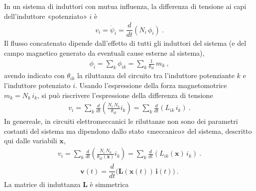 \documentclass[letterpaper,10pt,italian]{jupyterBook}
\begin{document}
\sphinxAtStartPar
In un sistema di induttori con mutua influenza, la differenza di tensione ai capi dell’induttore «potenziato» \(i\) è
\begin{equation*}
\begin{split}v_i = \dot{\psi}_i = \dfrac{d}{dt} \left( N_i \, \phi_i \right) \ .\end{split}
\end{equation*}
\sphinxAtStartPar
Il flusso concatenato dipende dall’effetto di tutti gli induttori del sistema (e del campo magnetico generato da eventuali cause esterne al sistema),
\begin{equation*}
\begin{split}\phi_i = \sum_{k} \phi_{ik} = \sum_{k} \frac{1}{\theta_{ik}} \, m_k \ ,\end{split}
\end{equation*}
\sphinxAtStartPar
avendo indicato con \(\theta_{ik}\) la riluttanza del circuito tra l’induttore potenziante \(k\) e l’induttore potenziato \(i\). Usando l’espressione della forza magneto\sphinxhyphen{}motrice \(m_k = N_k \, i_k\), si può riscrivere l’espressione della differenza di tensione
\begin{equation*}
\begin{split}v_i = \sum_k \frac{d}{dt} \left( \frac{N_i \, N_k}{\theta_{ik}} i_k \right) = \sum_k \frac{d}{dt} \left( L_{ik} \, i_k \right) \ .\end{split}
\end{equation*}
\sphinxAtStartPar
In genereale, in circuiti elettromeccanici le riluttanze non sono dei parametri costanti del sistema ma dipendono dallo stato «meccanico» del sistema, descritto qui dalle variabili \(\mathbf{x}\),
\begin{equation*}
\begin{split}v_i = \sum_k \frac{d}{dt} \left( \frac{N_i \, N_k}{\theta_{ik}(\mathbf{x})} i_k \right) = \sum_k \frac{d}{dt} \left( L_{ik} (\mathbf{x}) \, i_k \right) \ .\end{split}
\end{equation*}\begin{equation*}
\begin{split}\mathbf{v}(t) = \dfrac{d}{dt} \Big( \mathbf{L}(\mathbf{x}(t)) \, \mathbf{i}(t) \Big) \ .\end{split}
\end{equation*}
\sphinxAtStartPar
La matrice di induttanza \(\mathbf{L}\) è simmetrica  
\end{document}
